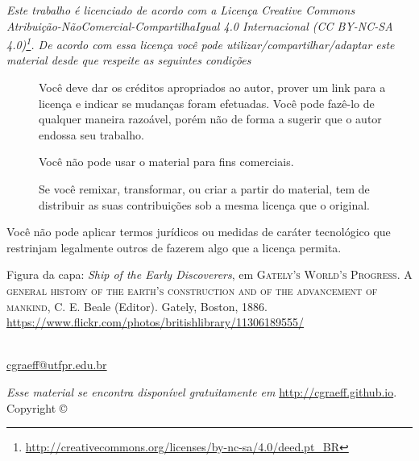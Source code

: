 \thispagestyle{empty}
\begin{center}
\Huge\ccbyncsa
\end{center}
{\it
Este trabalho é licenciado de acordo com a Licença Creative Commons  Atribuição-NãoComercial-CompartilhaIgual 4.0 Internacional  (CC BY-NC-SA 4.0)\footnote{\url{http://creativecommons.org/licenses/by-nc-sa/4.0/deed.pt_BR}}. De acordo com essa licença você pode utilizar/compartilhar/adaptar este material desde que respeite as seguintes condições
\begin{description}
	\item[\ccAttribution]Você deve dar os créditos apropriados ao autor, prover um link para a licença e indicar se mudanças foram efetuadas. Você pode fazê-lo de qualquer maneira razoável, porém não de forma a sugerir que o autor endossa seu trabalho.

    \item[\ccNonCommercial]Você não pode usar o material para fins comerciais.

    \item[\ccShareAlike]Se você remixar, transformar, ou criar a partir do material, tem de distribuir as suas contribuições sob a mesma licença que o original.
\end{description}
Você não pode aplicar termos jurídicos ou medidas de caráter tecnológico que restrinjam legalmente outros de fazerem algo que a licença permita.
}

%
\vfill
%
\begin{fullwidth}
Figura da capa: \textit{Ship of the Early Discoverers}, em \textsc{Gately's World's Progress. A general history of the earth's construction and of the advancement of mankind}, C. E. Beale (Editor). Gately, Boston, 1886. \url{https://www.flickr.com/photos/britishlibrary/11306189555/}
\end{fullwidth}
%
\vfill
%
%
\begin{fullwidth}
\setlength{\parindent}{0pt}
\setlength{\parskip}{\baselineskip}
\thanklessauthor\\
\url{cgraeff@utfpr.edu.br}\\
\textit{\monthyear}
\end{fullwidth}
%
\vspace{1cm}
%
\begin{fullwidth}
\par\emph{Esse material se encontra disponível gratuitamente em} \url{http://cgraeff.github.io}.\\
\noindent{}Copyright \copyright\ \the\year\ \thanklessauthor
\end{fullwidth}
